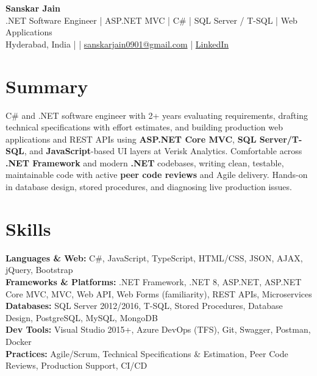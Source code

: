 \documentclass[10pt,letterpaper]{article}
\begin{document}
\begin{center}
    {\Large \textbf{Sanskar Jain}} \\
    .NET Software Engineer \;|\; ASP.NET MVC \;|\; C\# \;|\; SQL Server / T-SQL \;|\; Web Applications \\
    Hyderabad, India \enspace |  \enspace | \enspace
    \href{mailto:sanskarjain0901@gmail.com}{sanskarjain0901@gmail.com} \enspace | \enspace
    \href{https://www.linkedin.com/in/sanskar-jain0901/}{LinkedIn}
\end{center}

\vspace{2pt}

\section*{Summary}
C\# and .NET software engineer with 2+ years evaluating requirements, drafting technical specifications with effort estimates, and building production web applications and REST APIs using \textbf{ASP.NET Core MVC}, \textbf{SQL Server/T-SQL}, and \textbf{JavaScript}-based UI layers at Verisk Analytics. Comfortable across \textbf{.NET Framework} and modern \textbf{.NET} codebases, writing clean, testable, maintainable code with active \textbf{peer code reviews} and Agile delivery. Hands-on in database design, stored procedures, and diagnosing live production issues.

\section*{Skills}
\textbf{Languages \& Web:} C\#, JavaScript, TypeScript, HTML/CSS, JSON, AJAX, jQuery, Bootstrap \\
\textbf{Frameworks \& Platforms:} .NET Framework, .NET 8, ASP.NET, ASP.NET Core MVC, MVC, Web API, Web Forms (familiarity), REST APIs, Microservices \\
\textbf{Databases:} SQL Server 2012/2016, T-SQL, Stored Procedures, Database Design, PostgreSQL, MySQL, MongoDB \\
\textbf{Dev Tools:} Visual Studio 2015+, Azure DevOps (TFS), Git, Swagger, Postman, Docker \\
\textbf{Practices:} Agile/Scrum, Technical Specifications \& Estimation, Peer Code Reviews, Production Support, CI/CD
\end{document}
